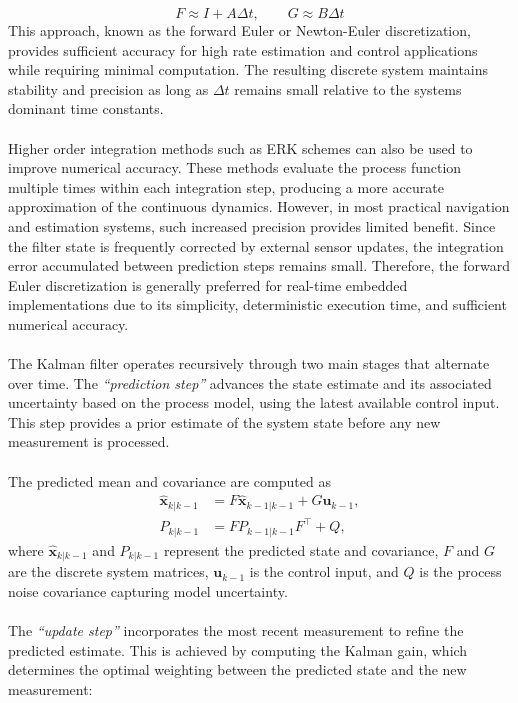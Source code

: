 $$
    F \approx I + A\Delta t, \qquad
    G \approx B\Delta t
$$
This approach, known as the forward Euler or Newton-Euler discretization, provides sufficient accuracy for high rate estimation and control applications while requiring minimal computation. The resulting discrete system maintains stability and precision as long as $\Delta t$ remains small relative to the systems dominant time constants.  
\\ \\
Higher order integration methods such as ERK schemes can also be used to improve numerical accuracy. These methods evaluate the process function multiple times within each integration step, producing a more accurate approximation of the continuous dynamics. However, in most practical navigation and estimation systems, such increased precision provides limited benefit. Since the filter state is frequently corrected by external sensor updates, the integration error accumulated between prediction steps remains small. Therefore, the forward Euler discretization is generally preferred for real-time embedded implementations due to its simplicity, deterministic execution time, and sufficient numerical accuracy.  
\\ \\
The Kalman filter operates recursively through two main stages that alternate over time. The \textit{``prediction step''} advances the state estimate and its associated uncertainty based on the process model, using the latest available control input. This step provides a prior estimate of the system state before any new measurement is processed.  
\\ \\
The predicted mean and covariance are computed as
$$
\begin{aligned}
    \hat{\mathbf{x}}_{k|k-1} &= F\hat{\mathbf{x}}_{k-1|k-1} + G\mathbf{u}_{k-1}, \\
    P_{k|k-1} &= FP_{k-1|k-1}F^\top + Q,
\end{aligned}
$$
where $\hat{\mathbf{x}}_{k|k-1}$ and $P_{k|k-1}$ represent the predicted state and covariance, $F$ and $G$ are the discrete system matrices, $\mathbf{u}_{k-1}$ is the control input, and $Q$ is the process noise covariance capturing model uncertainty.  
\\ \\
The \textit{``update step''} incorporates the most recent measurement to refine the predicted estimate. This is achieved by computing the Kalman gain, which determines the optimal weighting between the predicted state and the new measurement:
